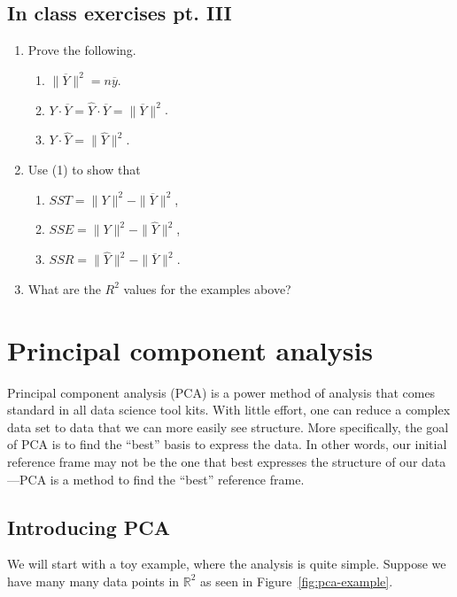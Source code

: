 \documentclass[a4paper, 12pt]{article}
\numberwithin{equation}{section}
\numberwithin{figure}{section}
\theoremstyle{definition}
\newcommand{\R}{\mathbb{R}}
\begin{document}
\subsection{In class exercises pt. III}

\begin{enumerate}
	\item Prove the following.
	\begin{enumerate}
		\item $\| \overline{Y} \|^2 = n\overline{y}$.
		\item $Y \cdot \overline{Y} = \widehat{Y}\cdot \overline{Y} = \| \overline{Y} \|^2$.
		\item $Y\cdot \widehat{Y} = \| \widehat{Y} \|^2$.
	\end{enumerate}
	\item Use (1) to show that 
	\begin{enumerate}
		\item $SST = \|Y\|^2 - \|\overline{Y}\|^2$,
		\item $SSE = \|Y\|^2 - \| \widehat{Y} \|^2$,
		\item $SSR = \| \widehat{Y} \|^2 - \| \overline{Y} \|^2$.
	\end{enumerate}
	\item What are the $R^2$ values for the examples above?
\end{enumerate}


\section{Principal component analysis}

Principal component analysis (PCA) is a power method of analysis that comes
standard in all data science tool kits. With little effort, one can reduce a
complex data set to data that we can more easily see structure. More
specifically, the goal of PCA is to find the ``best'' basis to express the data.
In other words, our initial reference frame may not be the one that best
expresses the structure of our data---PCA is a method to find the ``best''
reference frame.

\subsection{Introducing PCA}

We will start with a toy example, where the analysis is quite simple. Suppose we
have many many data points in $\R^2$ as seen in Figure~\ref{fig:pca-example}.
\end{document}
